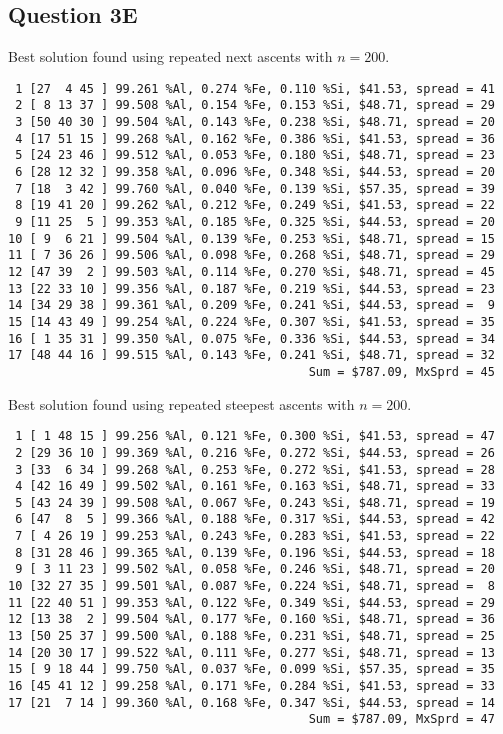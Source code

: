 \documentclass{article}
\begin{document}
\subsection{Question 3E}
Best solution found using repeated 
next ascents with $n=200$.
\begin{verbatim}
 1 [27  4 45 ] 99.261 %Al, 0.274 %Fe, 0.110 %Si, $41.53, spread = 41
 2 [ 8 13 37 ] 99.508 %Al, 0.154 %Fe, 0.153 %Si, $48.71, spread = 29
 3 [50 40 30 ] 99.504 %Al, 0.143 %Fe, 0.238 %Si, $48.71, spread = 20
 4 [17 51 15 ] 99.268 %Al, 0.162 %Fe, 0.386 %Si, $41.53, spread = 36
 5 [24 23 46 ] 99.512 %Al, 0.053 %Fe, 0.180 %Si, $48.71, spread = 23
 6 [28 12 32 ] 99.358 %Al, 0.096 %Fe, 0.348 %Si, $44.53, spread = 20
 7 [18  3 42 ] 99.760 %Al, 0.040 %Fe, 0.139 %Si, $57.35, spread = 39
 8 [19 41 20 ] 99.262 %Al, 0.212 %Fe, 0.249 %Si, $41.53, spread = 22
 9 [11 25  5 ] 99.353 %Al, 0.185 %Fe, 0.325 %Si, $44.53, spread = 20
10 [ 9  6 21 ] 99.504 %Al, 0.139 %Fe, 0.253 %Si, $48.71, spread = 15
11 [ 7 36 26 ] 99.506 %Al, 0.098 %Fe, 0.268 %Si, $48.71, spread = 29
12 [47 39  2 ] 99.503 %Al, 0.114 %Fe, 0.270 %Si, $48.71, spread = 45
13 [22 33 10 ] 99.356 %Al, 0.187 %Fe, 0.219 %Si, $44.53, spread = 23
14 [34 29 38 ] 99.361 %Al, 0.209 %Fe, 0.241 %Si, $44.53, spread =  9
15 [14 43 49 ] 99.254 %Al, 0.224 %Fe, 0.307 %Si, $41.53, spread = 35
16 [ 1 35 31 ] 99.350 %Al, 0.075 %Fe, 0.336 %Si, $44.53, spread = 34
17 [48 44 16 ] 99.515 %Al, 0.143 %Fe, 0.241 %Si, $48.71, spread = 32
                                          Sum = $787.09, MxSprd = 45
\end{verbatim}
Best solution found using repeated steepest ascents with $n=200$.
\begin{verbatim}
 1 [ 1 48 15 ] 99.256 %Al, 0.121 %Fe, 0.300 %Si, $41.53, spread = 47
 2 [29 36 10 ] 99.369 %Al, 0.216 %Fe, 0.272 %Si, $44.53, spread = 26
 3 [33  6 34 ] 99.268 %Al, 0.253 %Fe, 0.272 %Si, $41.53, spread = 28
 4 [42 16 49 ] 99.502 %Al, 0.161 %Fe, 0.163 %Si, $48.71, spread = 33
 5 [43 24 39 ] 99.508 %Al, 0.067 %Fe, 0.243 %Si, $48.71, spread = 19
 6 [47  8  5 ] 99.366 %Al, 0.188 %Fe, 0.317 %Si, $44.53, spread = 42
 7 [ 4 26 19 ] 99.253 %Al, 0.243 %Fe, 0.283 %Si, $41.53, spread = 22
 8 [31 28 46 ] 99.365 %Al, 0.139 %Fe, 0.196 %Si, $44.53, spread = 18
 9 [ 3 11 23 ] 99.502 %Al, 0.058 %Fe, 0.246 %Si, $48.71, spread = 20
10 [32 27 35 ] 99.501 %Al, 0.087 %Fe, 0.224 %Si, $48.71, spread =  8
11 [22 40 51 ] 99.353 %Al, 0.122 %Fe, 0.349 %Si, $44.53, spread = 29
12 [13 38  2 ] 99.504 %Al, 0.177 %Fe, 0.160 %Si, $48.71, spread = 36
13 [50 25 37 ] 99.500 %Al, 0.188 %Fe, 0.231 %Si, $48.71, spread = 25
14 [20 30 17 ] 99.522 %Al, 0.111 %Fe, 0.277 %Si, $48.71, spread = 13
15 [ 9 18 44 ] 99.750 %Al, 0.037 %Fe, 0.099 %Si, $57.35, spread = 35
16 [45 41 12 ] 99.258 %Al, 0.171 %Fe, 0.284 %Si, $41.53, spread = 33
17 [21  7 14 ] 99.360 %Al, 0.168 %Fe, 0.347 %Si, $44.53, spread = 14
                                          Sum = $787.09, MxSprd = 47
\end{verbatim}
\end{document}
